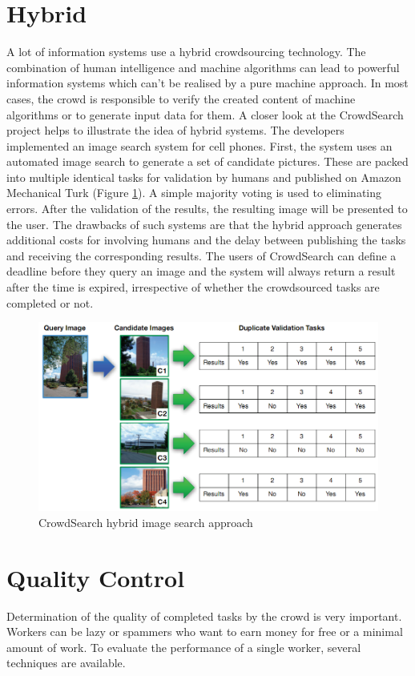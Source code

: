 \section{Hybrid}
A lot of information systems use a hybrid crowdsourcing technology. The combination of human intelligence and machine algorithms can lead to powerful information systems which can't be realised by a pure machine approach. In most cases, the crowd is responsible to verify the created content of machine algorithms or to generate input data for them. 
A closer look at the CrowdSearch \cite{crowdsearch} project helps to illustrate the idea of hybrid systems. The developers implemented an image search system for cell phones. First, the system uses an automated image search to generate a set of candidate pictures. These are packed into multiple identical tasks for validation by humans and published on Amazon Mechanical Turk (Figure \ref{crowdsearch}). A simple majority voting is used to eliminating errors. After the validation of the results, the resulting image will be presented to the user. The drawbacks of such systems are that the hybrid approach generates additional costs for involving humans and the delay between publishing the tasks and receiving the corresponding results. The users of CrowdSearch can define a deadline before they query an image and the system will always return a result after the time is expired, irrespective of whether the crowdsourced tasks are completed or not. 
\begin{figure}
\centering
\includegraphics[scale=0.45]{images/crowdsearch_hybrid.png}
\caption{CrowdSearch hybrid image search approach}
\label{crowdsearch}
\end{figure}

\section{Quality Control}
Determination of the quality of completed tasks by the crowd is very important. Workers can be lazy or spammers who want to earn money for free or a minimal amount of work. To evaluate the performance of a single worker, several techniques are available. 
